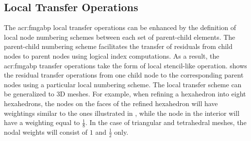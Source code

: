 \subsection{Local Transfer Operations}
The \gls{acr:fmgabp} local transfer operations can be enhanced by the definition of local node numbering schemes between each set of parent-child elements.
The parent-child numbering scheme facilitates the transfer of residuals from child nodes to parent nodes using logical index computations.
As a result, the \gls{acr:fmgabp} transfer operations take the form of local stencil-like operation.
 shows the residual transfer operations from one child node to the corresponding parent nodes using a particular local numbering scheme.
The local transfer scheme can be generalized to 3D meshes.
For example, when refining a hexahedron into eight hexahedrons, the nodes on the faces of the refined hexahedron will have weightings similar to the ones illustrated in , while the node in the interior will have a weighting equal to $\frac{1}{8}$.
In the case of triangular and tetrahedral meshes, the nodal weights will consist of $1$ and $\frac{1}{2}$ only.

